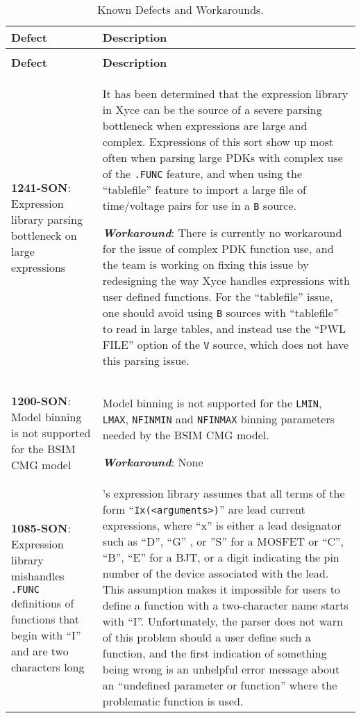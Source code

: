 {
\small

\begin{longtable}[h] {>{\raggedright\small}m{2in}|>{\raggedright\let\\\tabularnewline\small}m{3.5in}}
  \caption{Known Defects and Workarounds.} \\ \hline
  \rowcolor{XyceDarkBlue} \color{white}\textbf{Defect} & \color{white}\textbf{Description} \\ \hline \endfirsthead
  \caption[]{Known Defects and Workarounds.} \\ \hline
  \rowcolor{XyceDarkBlue} \color{white}\textbf{Defect} & \color{white}\textbf{Description}
  \\ \hline \endhead

%
%
\textbf{1241-SON}: Expression library parsing bottleneck on large expressions &
It has been determined that the expression library in Xyce can be the
source of a severe parsing bottleneck when expressions are large and
complex.  Expressions of this sort show up most often when parsing
large PDKs with complex use of the \texttt{.FUNC} feature, and when
using the ``tablefile'' feature to import a large file of time/voltage
pairs for use in a \texttt{B} source.

\textbf{\textit{Workaround}}:
There is currently no workaround for the issue of complex PDK function
use, and the team is working on fixing this issue by redesigning the
way Xyce handles expressions with user defined functions.  For the
``tablefile'' issue, one should avoid using \texttt{B} sources with
``tablefile'' to read in large tables, and instead use the ``PWL
FILE'' option of the \texttt{V} source, which does not have this
parsing issue.
\\ \hline

\textbf{1200-SON}: Model binning is not supported for the BSIM CMG model & Model
binning is not supported for the \texttt{LMIN}, \texttt{LMAX}, \texttt{NFINMIN}
and \texttt{NFINMAX} binning parameters needed by the BSIM CMG model.

\textbf{\textit{Workaround}}: None
\\ \hline

\textbf{1085-SON}: Expression library mishandles \texttt{.FUNC} definitions of functions that begin with ``I'' and are two characters long &
\Xyce{}'s expression library assumes that all terms of the form
``\texttt{Ix(<arguments>)}'' are lead current expressions, where ``x'' is
either a lead designator such as ``D'', ``G'' , or ''S'' for a MOSFET
or ``C'', ``B'', ``E'' for a BJT, or a digit indicating the pin number
of the device associated with the lead.  This assumption makes it
impossible for users to define a function with a two-character name
starts with ``I''.  Unfortunately, the parser does not warn of this
problem should a user define such a function, and the first indication
of something being wrong is an unhelpful error message about an
``undefined parameter or function'' where the problematic function is
used.


\end{longtable}}
